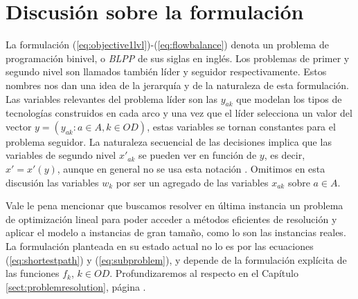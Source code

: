 \section*{Discusión sobre la formulación}

La formulación (\ref{eq:objective1lvl})-(\ref{eq:flowbalance}) denota un problema de programación binivel, o {\it BLPP} de sus siglas en inglés. Los problemas de primer y segundo nivel son llamados también líder y seguidor respectivamente. Estos nombres nos dan una idea de la jerarquía y de la naturaleza de esta formulación. Las variables relevantes del problema líder son las $y_{ak}$ que modelan los tipos de tecnologías construidos en cada arco y una vez que el líder selecciona un valor del vector $y = \left( y_{ak}: a \in A, k \in OD \right)$, estas variables se tornan constantes para el problema seguidor. La naturaleza secuencial de las decisiones implica que las variables de segundo nivel $x'_{ak}$ se pueden ver en función de $y$, es decir, $x' = x'(y)$, aunque en general no se usa esta notación \parencite{bardbook}. Omitimos en esta discusión las variables $w_k$ por ser un agregado de las variables $x_{ak}$ sobre $a \in A$.

Vale le pena mencionar que buscamos resolver en última instancia un problema de optimización lineal para poder acceder a métodos eficientes de resolución y aplicar el modelo a instancias de gran tamaño, como lo son las instancias reales. La formulación planteada en su estado actual no lo es por las ecuaciones (\ref{eq:shortestpath}) y (\ref{eq:subproblem}), y depende de la formulación explícita de las funciones $f_k$, $k \in OD$. Profundizaremos al respecto en el Capítulo \ref{sect:problemresolution}, página \pageref{sect:problemresolution}.


